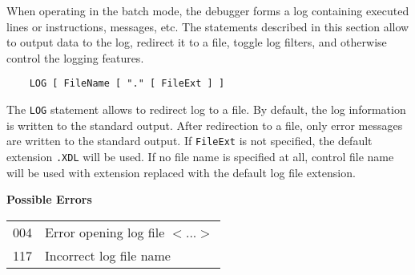 When operating in the batch mode, the debugger forms a log containing
executed lines or instructions, messages, etc. The statements
described in this section allow to output data to the log, redirect it
to a file, toggle log filters, and otherwise control the logging features.

{\samepage
{}\label{batch:LOG}
\begin{verbatim}
    LOG [ FileName [ "." [ FileExt ] ]
\end{verbatim}
The \verb'LOG' statement allows to redirect log to a file.
By default, the log information is written to the standard output.
After redirection to a file, only error messages are written to the
standard output.
If \verb'FileExt' is not specified, the default extension \verb'.XDL' will be used.
If no file name is specified at all, control file name will be used
with extension replaced with the default log file extension.
} %
\pagebreak[1]

{\samepage
{\bf Possible Errors}
\begin{flushleft}
\begin{tabular}{ll}
004 & Error opening log file $<$...$>$ \\
117 & Incorrect log file name
\end{tabular}
\end{flushleft}
} %
{} %


